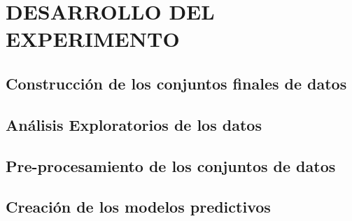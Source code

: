 \chapter{DESARROLLO DEL EXPERIMENTO}
\section{Construcción de los conjuntos finales de datos}

\section{Análisis Exploratorios de los datos}

\section{Pre-procesamiento de los conjuntos de datos}

\section{Creación de los modelos predictivos}
